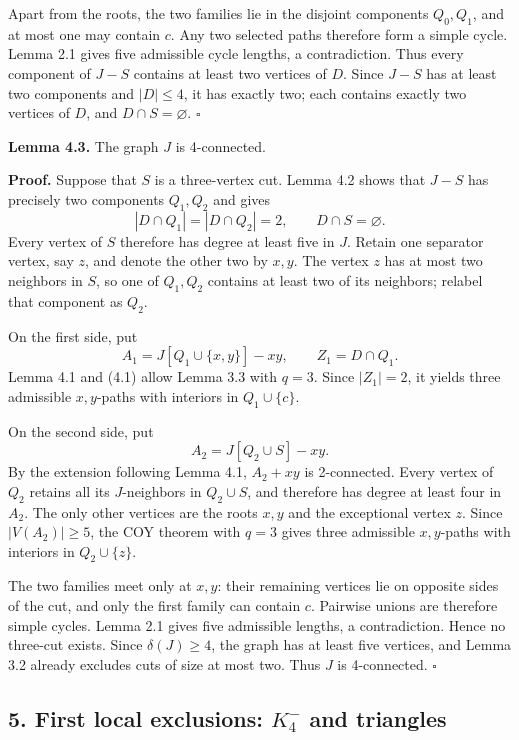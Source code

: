 \documentclass[
  11pt]{article}
\let\papersection\subsection
\renewcommand{\subsection}{\Needspace{10\baselineskip}\papersection}
\begin{document}
Apart from the roots, the two families lie in the disjoint components
\(Q_0,Q_1\), and at most one may contain \(c\). Any two selected paths
therefore form a simple cycle. Lemma 2.1 gives five admissible cycle
lengths, a contradiction. Thus every component of \(J-S\) contains at
least two vertices of \(D\). Since \(J-S\) has at least two components
and \(|D|\le4\), it has exactly two; each contains exactly two vertices
of \(D\), and \(D\cap S=\varnothing\). \(\square\)

\textbf{Lemma 4.3.} The graph \(J\) is 4-connected.

\textbf{Proof.} Suppose that \(S\) is a three-vertex cut. Lemma 4.2
shows that \(J-S\) has precisely two components \(Q_1,Q_2\) and gives \[
 |D\cap Q_1|=|D\cap Q_2|=2,
 \qquad
 D\cap S=\varnothing. \tag{4.2}
\] Every vertex of \(S\) therefore has degree at least five in \(J\).
Retain one separator vertex, say \(z\), and denote the other two by
\(x,y\). The vertex \(z\) has at most two neighbors in \(S\), so one of
\(Q_1,Q_2\) contains at least two of its neighbors; relabel that
component as \(Q_2\).

On the first side, put \[
 A_1=J[Q_1\cup\{x,y\}]-xy,
 \qquad Z_1=D\cap Q_1.
\] Lemma 4.1 and (4.1) allow Lemma 3.3 with \(q=3\). Since \(|Z_1|=2\),
it yields three admissible \(x,y\)-paths with interiors in
\(Q_1\cup\{c\}\).

On the second side, put \[
 A_2=J[Q_2\cup S]-xy.
\] By the extension following Lemma 4.1, \(A_2+xy\) is 2-connected.
Every vertex of \(Q_2\) retains all its \(J\)-neighbors in
\(Q_2\cup S\), and therefore has degree at least four in \(A_2\). The
only other vertices are the roots \(x,y\) and the exceptional vertex
\(z\). Since \(|V(A_2)|\ge5\), the COY theorem with \(q=3\) gives three
admissible \(x,y\)-paths with interiors in \(Q_2\cup\{z\}\).

The two families meet only at \(x,y\): their remaining vertices lie on
opposite sides of the cut, and only the first family can contain \(c\).
Pairwise unions are therefore simple cycles. Lemma 2.1 gives five
admissible lengths, a contradiction. Hence no three-cut exists. Since
\(\delta(J)\ge4\), the graph has at least five vertices, and Lemma 3.2
already excludes cuts of size at most two. Thus \(J\) is 4-connected.
\(\square\)

\subsection{\texorpdfstring{5. First local exclusions: \(K_4^-\) and
triangles}{5. First local exclusions: K\_4\^{}- and triangles}}\label{first-local-exclusions-k_4--and-triangles}
\end{document}
